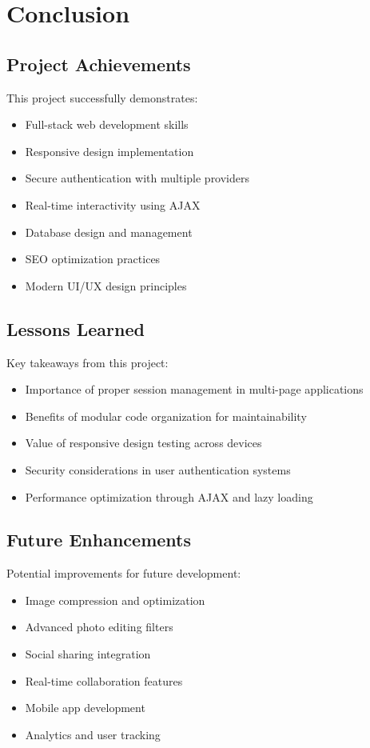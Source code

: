 \documentclass[12pt,a4paper]{article}
\begin{document}
\section{Conclusion}

\subsection{Project Achievements}
This project successfully demonstrates:
\begin{itemize}
    \item Full-stack web development skills
    \item Responsive design implementation
    \item Secure authentication with multiple providers
    \item Real-time interactivity using AJAX
    \item Database design and management
    \item SEO optimization practices
    \item Modern UI/UX design principles
\end{itemize}

\subsection{Lessons Learned}
Key takeaways from this project:
\begin{itemize}
    \item Importance of proper session management in multi-page applications
    \item Benefits of modular code organization for maintainability
    \item Value of responsive design testing across devices
    \item Security considerations in user authentication systems
    \item Performance optimization through AJAX and lazy loading
\end{itemize}

\subsection{Future Enhancements}
Potential improvements for future development:
\begin{itemize}
    \item Image compression and optimization
    \item Advanced photo editing filters
    \item Social sharing integration
    \item Real-time collaboration features
    \item Mobile app development
    \item Analytics and user tracking
\end{itemize}
\end{document}
